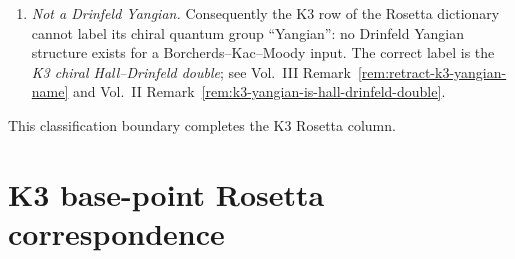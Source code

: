 \begin{remark}
\begin{enumerate}[label=\textup{(D\arabic*)}]
 $\Delta_5 = \mathrm{Grit}(\eta^9\vartheta_1)$ from the weight-$9/2$
 index-$1/2$ Jacobi form $\eta^9\vartheta_1$
 \textup{(}Gritsenko $1999$\textup{)}, and the \emph{Borcherds
 multiplicative lift}
 $\Delta_5 = \mathrm{Borch}(\phi_{0,1}^{\mathrm{EZ}})$ from the
 weight-$0$ index-$1$ Jacobi form with
 $\phi_{0,1}^{K3}=2\,\phi_{0,1}^{\mathrm{EZ}}$
 \textup{(}Borcherds $1998$\textup{)}. Both produce the same weight-$5$
 Siegel form on the Maass $\Z/2$-spin cover of
 $\mathrm{Sp}_4(\mathbb{Z})$; their equivalence is a Shimura--Waldspurger
 phenomenon. The M-theory side
 (Remark~\ref{rem:rosetta-Delta5-11D-SUGRA}) sees the additive
 lift: the weight-$5$ SUGRA one-loop determinant is the Gritsenko
 image of the $\mathcal{N}=4$ chiral-half index. The class-$\cS$ side
 (Remark~\ref{rem:rosetta-classS-sigma-0-24}) sees the
 multiplicative lift: the protected Schur index reduces under
 $M_{24}$-averaging to $\phi_{0,1}^{K3}$; dividing by the canonical
 factor~$2$ gives $\phi_{0,1}^{\mathrm{EZ}}$, whose Borcherds
 singular-theta lift is $\Delta_5$. The Rosetta dictionary's two M-theory and
 gauge-theory entries are therefore related by Gritsenko--Borcherds
 duality \textup{(}Gritsenko--Nikulin $1998$, Theorem $2.1$\textup{)}.
 Ikeda $2001$ produces $\Delta_{10}$ from a weight-$16$ elliptic
 source; it does not produce $\Delta_5$.
\item \emph{Not a Drinfeld Yangian.} Consequently the K3 row of the
 Rosetta dictionary cannot label its chiral quantum group ``Yangian'':
 no Drinfeld Yangian structure exists for a Borcherds--Kac--Moody
 input. The correct label is the \emph{K3 chiral Hall--Drinfeld
 double}; see Vol.~III
 Remark~\ref{rem:retract-k3-yangian-name} and Vol.~II
 Remark~\ref{rem:k3-yangian-is-hall-drinfeld-double}.
\end{enumerate}
This classification boundary completes the K3 Rosetta column.
\end{remark}

\section{K3 base-point Rosetta correspondence}
\label{sec:rs-supplement}

